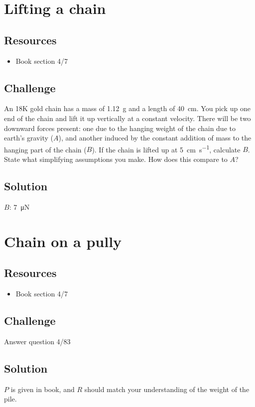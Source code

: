 \newpage
\section{Lifting a chain}

\subsection*{Resources}
\begin{itemize}
    \item Book section 4/7
\end{itemize}

\subsection*{Challenge}
An 18K gold chain has a mass of \SI{1.12}{\gram} and a length of \SI{40}{\cm}. You pick up one end of the chain and lift it up vertically at a constant velocity. There will be two downward forces present: one due to the hanging weight of the chain due to earth's gravity ($A$), and another induced by the constant addition of mass to the hanging part of the chain ($B$). If the chain is lifted up at \SI{5}{\cm\per\s}, calculate $B$. State what simplifying assumptions you make. How does this compare to $A$?

\subsection*{Solution}
$B$: \SI{7}{\micro\newton}




\newpage
\section{Chain on a pully}

\subsection*{Resources}
\begin{itemize}
    \item Book section 4/7
\end{itemize}

\subsection*{Challenge}
Answer question 4/83

\subsection*{Solution}
$P$ is given in book, and $R$ should match your understanding of the weight of the pile.




